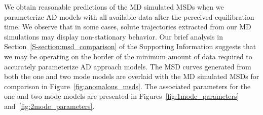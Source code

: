 \documentclass[journal=jctcce,manuscript=article]{achemso}
\begin{document}
  We obtain reasonable predictions of the MD simulated MSDs when we
  parameterize AD models with all available data after the perceived
  equilibration time.   
  We observe that in some cases, solute trajectories extracted from our MD
  simulations may display non-stationary behavior. Our brief analysis 
  in Section~\ref{S-section:msd_comparison} of the Supporting Information 
  suggests that we may be operating on the border of the minimum amount of
  data required to accurately parameterize AD approach models.
  The MSD curves generated from both the one and two mode models are overlaid
  with the MD simulated MSDs for comparison in Figure~\ref{fig:anomalous_msds}.
  The associated parameters for the one and two mode models are presented in
  Figures~\ref{fig:1mode_parameters} and~\ref{fig:2mode_parameters}.
  
\end{document}

